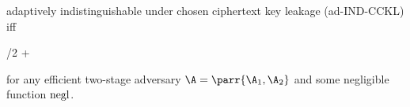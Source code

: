 \begin{definition}
\begin{sitemize}
        \item adaptively indistinguishable under chosen ciphertext key leakage (ad-IND-CCKL) iff
        \begin{bralign}
            /2 + \negl\parr{\secpar}
        \end{bralign}
    \end{sitemize}
    for any efficient two-stage adversary \(\A = \parr{\A_1, \A_2}\) and some negligible function \(\operatorname{negl}\).
\end{definition}